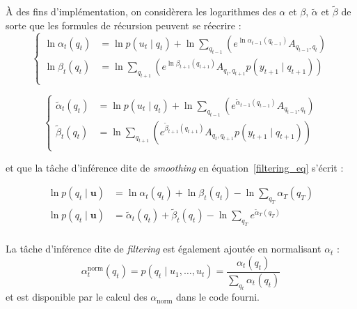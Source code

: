 \documentclass[12pt,a4paper,onecolumn]{article}
\begin{document}
À des fins d'implémentation, on considèrera les logarithmes des \(\alpha\) et \(\beta\), \(\tilde{\alpha}\) et \(\tilde{\beta}\) de sorte que les formules de récursion peuvent se réecrire :
\begin{equation}
	\left\{
	\begin{split}
		\ln\alpha_t(q_t) &= \ln p(u_t \mid q_t) + \ln\sum_{q_{t-1}}\left(e^{\ln \alpha_{t-1}(q_{t-1})}A_{q_{t-1}, q_{t}}\right)\\
		\ln\beta_t(q_t) &= \ln\sum_{q_{t+1}}\left(e^{\ln \beta_{t+1}(q_{t+1})}A_{q_{t}, q_{t+1}}p(y_{t+1}\mid q_{t+1})\right)\\
	\end{split}
	\right.
\end{equation}

\begin{equation}
	\left\{
	\begin{split}
		\tilde{\alpha}_t(q_t) &= \ln p(u_t \mid q_t) + \ln\sum_{q_{t-1}}\left(e^{\tilde{\alpha}_{t-1}(q_{t-1})}A_{q_{t-1}, q_{t}}\right)\\
		\tilde{\beta}_t(q_t) &= \ln\sum_{q_{t+1}}\left(e^{\tilde{\beta}_{t+1}(q_{t+1})}A_{q_{t}, q_{t+1}}p(y_{t+1}\mid q_{t+1})\right)\\
	\end{split}
	\right.
\end{equation}

et que la tâche d'inférence dite de \textit{smoothing} en équation~\eqref{filtering_eq} s'écrit :

\begin{equation}
	\begin{split}
		\ln p(q_t \mid \bm{u}) &= \ln\alpha_t(q_t) + \ln\beta_t(q_t) - \ln \sum_{q_T}\alpha_T(q_T)\\
		\ln p(q_t \mid \bm{u}) &= \tilde{\alpha}_t(q_t) + \tilde{\beta}_t(q_t) - \ln \sum_{q_T}e^{\tilde{\alpha}_T(q_T)}\\
	\end{split}
\end{equation}

La tâche d'inférence dite de \textit{filtering} est également ajoutée en normalisant \(\alpha_t\) :
\begin{equation*}
	\alpha_t^{\text{norm}}(q_t) = p(q_t \mid u_1, \dots, u_t) = \frac{\alpha_t(q_t)}{\sum_{q_t}\alpha_t(q_t)}
\end{equation*}
et est disponible par le calcul des \(\alpha_{\text{norm}}\) dans le code fourni.

\subsection{}
\end{document}
